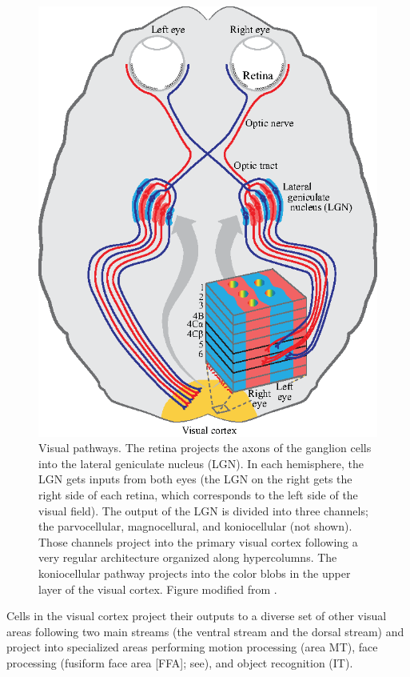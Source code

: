 \begin{figure}[t]
\centerline{
\includegraphics[width=.7\linewidth]{figures/taxonomy/visual_pathways_aina.eps}
} 
\caption{Visual pathways. The retina projects the axons of the ganglion cells into the lateral geniculate nucleus (LGN). In each hemisphere, the LGN gets inputs from both eyes (the LGN on the right gets the right side of each retina, which corresponds to the left side of the visual field). The output of the LGN is divided into three channels; the parvocellular, magnocellural, and koniocellular (not shown). Those channels project into the primary visual cortex following a very regular architecture organized along hypercolumns. The koniocellular pathway projects into the color blobs in the upper layer of the visual cortex. Figure modified from \cite{kandel:neural}.} 
\label{fig:visual_pathways}
\end{figure}



Cells in the visual cortex project their outputs to a diverse set of other visual areas following two main streams (the ventral stream and the dorsal stream) and project into specialized areas performing motion processing (area MT), face processing (fusiform face area [FFA]; see\cite{Kanwisher1997TheFF}), and object recognition (IT).

